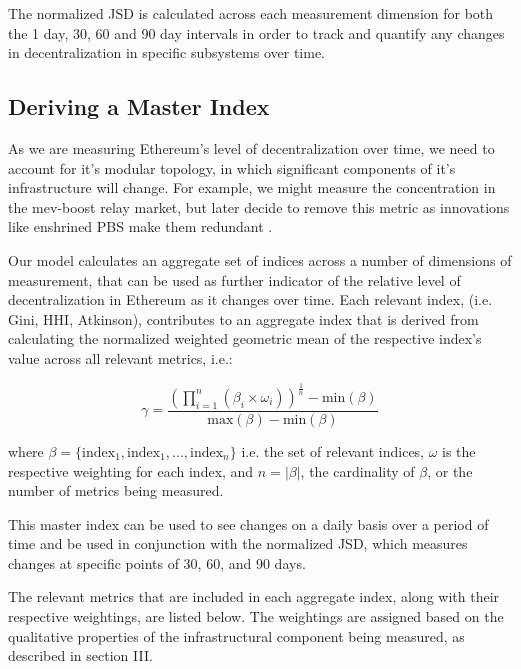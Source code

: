 \documentclass[conference]{IEEEtran}
\begin{document}
\vspace{8pt}

The normalized JSD is calculated across each measurement dimension for both the 1 day, 30, 60 and 90 day intervals in order to track and quantify any changes in decentralization in specific subsystems over time.

\subsection{Deriving a Master Index}

As we are measuring Ethereum's level of decentralization over time, we need to account for it's modular topology, in which significant components of it's infrastructure will change.  For example, we might measure the concentration in the mev-boost relay market, but later decide to remove this metric as innovations like enshrined PBS make them redundant \cite{neuder2023}.

Our model calculates an aggregate set of indices across a number of dimensions of measurement, that can be used as further indicator of the relative level of decentralization in Ethereum as it changes over time.  Each relevant index, (i.e. Gini, HHI, Atkinson), contributes to an aggregate index that is derived from calculating the normalized weighted geometric mean of the respective index's value across all relevant metrics, i.e.:

\[ \gamma = \frac{{\left(\prod_{i=1}^{n} (\beta_i \times \omega_i)\right)^{\frac{1}{n}} - \text{min}\left(\beta\right)}}{{\text{max}\left(\beta\right) - \text{min}\left(\beta\right)}} \]

\vspace{8pt}

where \(\beta=\{\text{index}_1, \text{index}_1, ..., \text{index}_n\}\) i.e. the set of relevant indices, $\omega$ is the respective weighting for each index, and $n=\left| \beta \right|$, the cardinality of $\beta$, or the number of metrics being measured.

This master index can be used to see changes on a daily basis over a period of time and be used in conjunction with the normalized JSD, which measures changes at specific points of 30, 60, and 90 days.

\hfill

The relevant metrics that are included in each aggregate index, along with their respective weightings, are listed below. The weightings are assigned based on the qualitative properties of the infrastructural component being measured, as described in section III.
\end{document}
